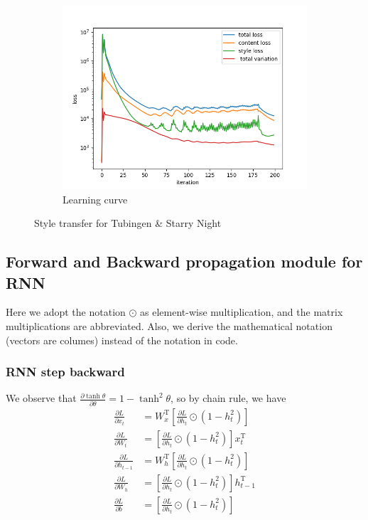 \documentclass[12pt]{article}
\begin{document}
\begin{figure}[htbp]
\begin{subfigure}[t]{0.48\textwidth}
        \includegraphics[trim={3in 0in 3in 0in},scale=0.5]{./Homework2/output/hw2p2_fig15.png}
        \caption{Learning curve}
    \label{hw2p2o}
    \end{subfigure}
    \caption{Style transfer for Tubingen \& Starry Night}
\end{figure}

\newpage
\subsection{Forward and Backward propagation module for RNN}
Here we adopt the notation \(\odot\) as element-wise multiplication, and the matrix multiplications are abbreviated.
Also, we derive the mathematical notation (vectors are columes) instead of the notation in code.

\setcounter{subsubsection}{1}
\subsubsection{RNN step backward}
We observe that \(\frac{\partial \tanh\theta}{\partial\theta}=1-\tanh^2\theta\), so by chain rule, we have
\begin{align*}
    \frac{\partial L}{\partial x_t}&= W_x^\mathrm{T}\left[\frac{\partial L}{\partial h_t}\odot (1-h_t^2) \right]\\
    \frac{\partial L}{\partial W_t}&= \left[\frac{\partial L}{\partial h_t}\odot (1-h_t^2) \right]x_t^\mathrm{T}\\
    \frac{\partial L}{\partial h_{t-1}}&= W_h^\mathrm{T}\left[\frac{\partial L}{\partial h_t}\odot (1-h_t^2) \right]\\
    \frac{\partial L}{\partial W_h}&= \left[\frac{\partial L}{\partial h_t}\odot (1-h_t^2) \right]h_{t-1}^\mathrm{T}\\
    \frac{\partial L}{\partial b}&= \left[\frac{\partial L}{\partial h_t}\odot (1-h_t^2) \right]
\end{align*}
\end{document}
